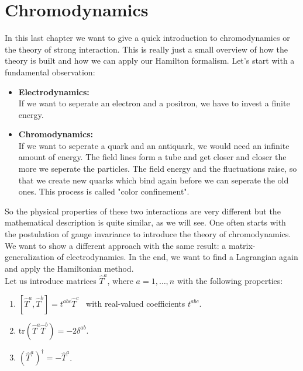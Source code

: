 \chapter{Chromodynamics}

In this last chapter we want to give a quick introduction to chromodynamics or the theory of strong interaction. This is really just a small overview of how the theory is built and how we can apply our Hamilton formalism. 
Let's start with a fundamental observation:

\begin{itemize}
\item \textbf{Electrodynamics:} \\
If we want to seperate an electron and a positron, we have to invest a finite energy.
\item \textbf{Chromodynamics:} \\
If we want to seperate a quark and an antiquark, we would need an infinite amount of energy. The field lines form a tube and get closer and closer the more we seperate the particles. The field energy and the fluctuations raise, so that we create new quarks which bind again before we can seperate the old ones. This process is called "color confinement".
\end{itemize}

So the physical properties of these two interactions are very different but the mathematical description is quite similar, as we will see.
One often starts with the postulation of gauge invariance to introduce the theory of chromodynamics. We want to show a different approach with the same result: a matrix-generalization of electrodynamics. 
In the end, we want to find a Lagrangian again and apply the Hamiltonian method. \\

Let us introduce matrices $\hat{T}^a$, where $a = 1, \dots, n$ with the following properties:
\begin{enumerate}
\item $[ \hat{T}^a , \hat{T}^b ] = t^{abc} \hat{T}^c$ \ with real-valued coefficients $t^{abc}$.
\item $\text{tr}(\hat{T}^a \hat{T}^b) = - 2 \delta^{ab}$.
\item $( \hat{T}^a )^\dag = - \hat{T}^a$.
\end{enumerate} 

